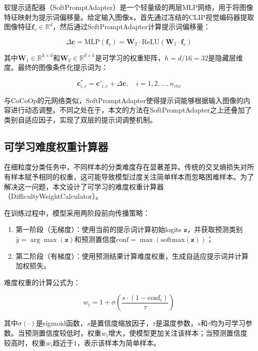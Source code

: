 \documentclass{HDU-Bachelor-Thesis}
\begin{document}
软提示适配器（SoftPromptAdapter）是一个轻量级的两层MLP网络，用于将图像特征映射为提示词偏移量。给定输入图像$\mathbf{x}$，首先通过冻结的CLIP视觉编码器提取图像特征$\mathbf{f}_v \in \mathbb{R}^d$，然后通过SoftPromptAdapter计算提示词偏移量：

\begin{equation}
\Delta\mathbf{c} = \text{MLP}(\mathbf{f}_v) = \mathbf{W}_2 \cdot \text{ReLU}(\mathbf{W}_1 \cdot \mathbf{f}_v)
\end{equation}

其中$\mathbf{W}_1 \in \mathbb{R}^{h \times d}$和$\mathbf{W}_2 \in \mathbb{R}^{d \times h}$是可学习的权重矩阵，$h = d/16 = 32$是隐藏层维度。最终的图像条件化提示词为：

\begin{equation}
\mathbf{c}^*_{i,c} = \mathbf{c}'_{i,c} + \Delta\mathbf{c}, \quad i = 1, 2, \ldots, n_{ctx}
\end{equation}

与CoCoOp的元网络类似，SoftPromptAdapter使得提示词能够根据输入图像的内容进行动态调整。不同之处在于，本文的方法在SoftPromptAdapter之上还叠加了类别自适应因子，实现了双层的提示词调整机制。

\subsection{可学习难度权重计算器}

在细粒度分类任务中，不同样本的分类难度存在显著差异。传统的交叉熵损失对所有样本赋予相同的权重，这可能导致模型过度关注简单样本而忽略困难样本。为了解决这一问题，本文设计了可学习的难度权重计算器（DifficultyWeightCalculator）。

在训练过程中，模型采用两阶段前向传播策略：

\begin{enumerate}
\item 第一阶段（无梯度）：使用当前的提示词计算初始logits $\mathbf{z}$，并获取预测类别$\hat{y} = \arg\max(\mathbf{z})$和预测置信度$\text{conf} = \max(\text{softmax}(\mathbf{z}))$；
\item 第二阶段（有梯度）：使用预测结果计算难度权重，生成自适应提示词并计算加权损失。
\end{enumerate}

难度权重的计算公式为：

\begin{equation}
w_i = 1 + \sigma\left(\frac{s \cdot (1 - \text{conf}_i)}{\tau}\right)
\end{equation}

其中$\sigma(\cdot)$是sigmoid函数，$s$是置信度缩放因子，$\tau$是温度参数，$s$和$\tau$均为可学习参数。当预测置信度较低时，权重$w_i$增大，使模型更加关注该样本；当预测置信度较高时，权重$w_i$趋近于1，表示该样本为简单样本。
\end{document}
